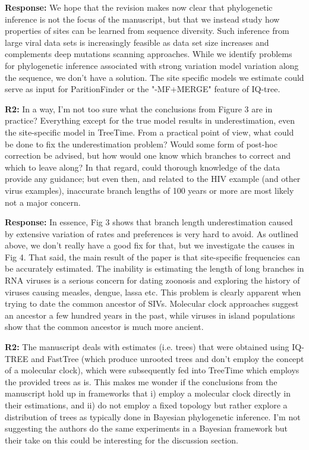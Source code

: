 \documentclass[aps,rmp,onecolumn]{revtex4-1}
\newcommand{\refb}[1]{\textbf{R2:} #1}
\newcommand{\response}[1]{{\color{black}\textbf{Response:} #1}}
\begin{document}
\response{
We hope that the revision makes now clear that phylogenetic inference is not the focus of the manuscript, but that we instead study how properties of sites can be learned from sequence diversity.
Such inference from large viral data sets is increasingly feasible as data set size increases and complements deep mutations scanning approaches.
While we identify problems for phylogenetic inference associated with strong variation model variation along the sequence, we don't have a solution.
The site specific models we estimate could serve as input for ParitionFinder or the "-MF+MERGE" feature of IQ-tree.
}


\refb{In a way, I’m not too sure what the conclusions from Figure 3 are in practice? Everything except for the true model results in underestimation, even the site-specific model in TreeTime. From a practical point of view, what could be done to fix the underestimation problem? Would some form of post-hoc correction be advised, but how would one know which branches to correct and which to leave along? In that regard, could thorough knowledge of the data provide any guidance; but even then, and related to the HIV example (and other virus examples), inaccurate branch lengths of 100 years or more are most likely not a major concern.}

\response{In essence, Fig 3 shows that branch length underestimation caused by extensive variation of rates and preferences is very hard to avoid.
As outlined above, we don't really have a good fix for that, but we investigate the causes in Fig 4.
That said, the main result of the paper is that site-specific frequencies can be accurately estimated.
The inability is estimating the length of long branches in RNA viruses is a serious concern for dating zoonosis and exploring the history of viruses causing measles, dengue, lassa etc.
This problem is clearly apparent when trying to date the common ancestor of SIVs.
Molecular clock approaches suggest an ancestor a few hundred years in the past, while viruses in island populations show that the common ancestor is much more ancient.
}



\refb{The manuscript deals with estimates (i.e. trees) that were obtained using IQ-TREE and FastTree (which produce unrooted trees and don’t employ the concept of a molecular clock), which were subsequently fed into TreeTime which employs the provided trees as is. This makes me wonder if the conclusions from the manuscript hold up in frameworks that i) employ a molecular clock directly in their estimations, and ii) do not employ a fixed topology but rather explore a distribution of trees as typically done in Bayesian phylogenetic inference. I’m not suggesting the authors do the same experiments in a Bayesian framework but their take on this could be interesting for the discussion section.}
\end{document}
